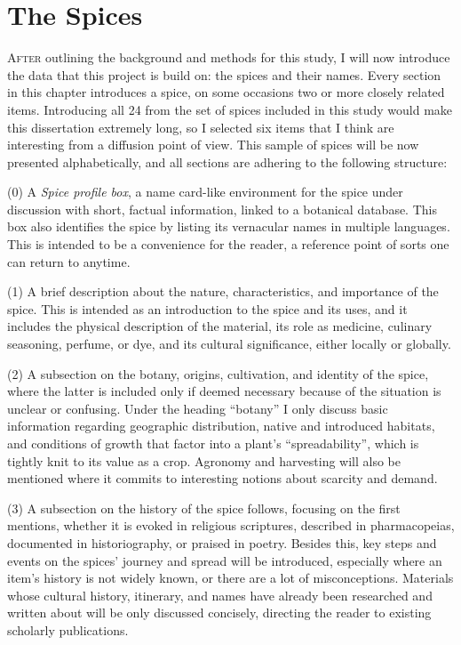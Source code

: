 \chapter{The Spices}
\label{ch:data}

\lettrine[lines=\iniciale,slope=0.5em,findent=-1em]{\textcolor{\accentcolor}{A}}{fter} outlining the background and methods for this study, I will now introduce the data that this project is build on: the spices and their names. Every section in this chapter introduces a spice, on some occasions two or more closely related items. Introducing all 24 from the set of spices included in this study would make this dissertation extremely long, so I selected six items that I think are interesting from a diffusion point of view. This sample of spices will be now presented alphabetically, and all sections are adhering to the following structure:

(0) A \textit{Spice profile box}, a name card-like environment for the spice under discussion with short, factual information, linked to a botanical database. This box also identifies the spice by listing its vernacular names in multiple languages. This is intended to be a convenience for the reader, a reference point of sorts one can return to anytime.

(1) A brief description about the nature, characteristics, and importance of the spice. This is intended as an introduction to the spice and its uses, and it includes the physical description of the material, its role as medicine, culinary seasoning, perfume, or dye, and its cultural significance, either locally or globally. 

(2) A subsection on the botany, origins, cultivation, and identity of the spice, where the latter is included only if deemed necessary because of the situation is unclear or confusing. Under the heading ``botany'' I only discuss basic information regarding geographic distribution, native and introduced habitats, and conditions of growth that factor into a plant's ``spreadability'', which is tightly knit to its value as a crop. Agronomy and harvesting will also be mentioned where it commits to interesting notions about scarcity and demand.

(3) A subsection on the history of the spice follows, focusing on the first mentions, whether it is evoked in religious scriptures, described in pharmacopeias, documented in historiography, or praised in poetry. Besides this, key steps and events on the spices' journey and spread will be introduced, especially where an item's history is not widely known, or there are a lot of misconceptions. Materials whose cultural history, itinerary, and names have already been researched and written about will be only discussed concisely, directing the reader to existing scholarly publications. 

